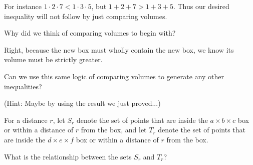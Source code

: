 

For instance $1\cdot 2\cdot 7<1\cdot 3\cdot 5$, but $1+2+7>1+3+5$. Thus our desired inequality will not follow by just comparing volumes.

Why did we think of comparing volumes to begin with?


Right, because the new box must wholly contain the new box, we know its volume must be strictly greater.

Can we use this same logic of comparing volumes to generate any other inequalities?






(Hint: Maybe by using the result we just proved...)

For a distance $r$, let $S_r$ denote the set of points that are inside the $a \times b \times c$ box or within a distance of $r$ from the box, and let $T_r$ denote the set of points that are inside the $d \times e \times f$ box or within a distance of $r$ from the box.

What is the relationship between the sets $S_r$ and $T_r$?


